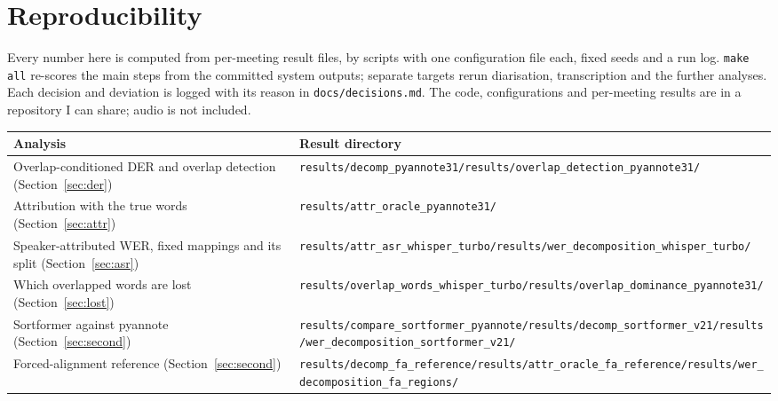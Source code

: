 \documentclass[11pt,a4paper]{article}
\begin{document}
\appendix
\section{Reproducibility}

Every number here is computed from per-meeting result files, by scripts with one configuration file each, fixed seeds and a run log. \texttt{make all} re-scores the main steps from the committed system outputs; separate targets rerun diarisation, transcription and the further analyses. Each decision and deviation is logged with its reason in \texttt{docs/decisions.md}. The code, configurations and per-meeting results are in a repository I can share; audio is not included.

\begin{center}
\small
\begin{tabularx}{\textwidth}{@{}L>{\raggedright\arraybackslash}p{8.0cm}@{}}
\toprule
Analysis & Result directory \\
\midrule
Overlap-conditioned DER and overlap detection (Section~\ref{sec:der}) & \texttt{results/decomp\_pyannote31/}\newline \texttt{results/overlap\_detection\_pyannote31/} \\
Attribution with the true words (Section~\ref{sec:attr}) & \texttt{results/attr\_oracle\_pyannote31/} \\
Speaker-attributed WER, fixed mappings and its split (Section~\ref{sec:asr}) & \texttt{results/attr\_asr\_whisper\_turbo/}\newline \texttt{results/wer\_decomposition\_whisper\_turbo/} \\
Which overlapped words are lost (Section~\ref{sec:lost}) & \texttt{results/overlap\_words\_whisper\_turbo/}\newline \texttt{results/overlap\_dominance\_pyannote31/} \\
Sortformer against pyannote (Section~\ref{sec:second}) & \texttt{results/compare\_sortformer\_pyannote/}\newline \texttt{results/decomp\_sortformer\_v21/}\newline \texttt{results/wer\_decomposition\_sortformer\_v21/} \\
Forced-alignment reference (Section~\ref{sec:second}) & \texttt{results/decomp\_fa\_reference/}\newline \texttt{results/attr\_oracle\_fa\_reference/}\newline \texttt{results/wer\_decomposition\_fa\_regions/} \\

\end{tabularx}
\end{center}
\end{document}
